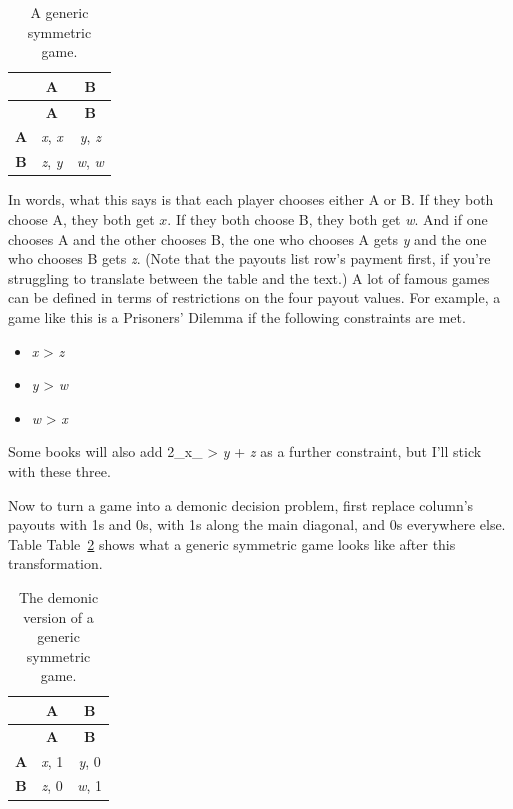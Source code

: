 \documentclass[
  12pt,
  letterpaper,
  DIV=11,
  numbers=noendperiod]{scrreprt}
\providecommand{\tightlist}{%
  \setlength{\itemsep}{0pt}\setlength{\parskip}{0pt}}\usepackage{longtable,booktabs,array}
\begin{document}
\begin{longtable}[]{@{}ccc@{}}
\caption{A generic symmetric
game.}\label{tbl-basic-sym-game}\tabularnewline
\toprule\noalign{}
& \textbf{A} & \textbf{B} \\
\midrule\noalign{}
\endfirsthead
\toprule\noalign{}
& \textbf{A} & \textbf{B} \\
\midrule\noalign{}
\endhead
\bottomrule\noalign{}
\endlastfoot
\textbf{A} & \emph{x}, \emph{x} & \emph{y}, \emph{z} \\
\textbf{B} & \emph{z}, \emph{y} & \emph{w}, \emph{w} \\
\end{longtable}

In words, what this says is that each player chooses either A or B. If
they both choose A, they both get \(x\). If they both choose B, they
both get \emph{w}. And if one chooses A and the other chooses B, the one
who chooses A gets \emph{y} and the one who chooses B gets \emph{z}.
(Note that the payouts list row's payment first, if you're struggling to
translate between the table and the text.) A lot of famous games can be
defined in terms of restrictions on the four payout values. For example,
a game like this is a Prisoners' Dilemma if the following constraints
are met.

\begin{itemize}
\tightlist
\item
  \emph{x} \textgreater{} \emph{z}
\item
  \emph{y} \textgreater{} \emph{w}
\item
  \emph{w} \textgreater{} \emph{x}
\end{itemize}

Some books will also add 2\_x\_ \textgreater{} \emph{y} + \emph{z} as a
further constraint, but I'll stick with these three.

Now to turn a game into a demonic decision problem, first replace
column's payouts with 1s and 0s, with 1s along the main diagonal, and 0s
everywhere else. Table Table~\ref{tbl-demon-sym-game} shows what a
generic symmetric game looks like after this transformation.

\begin{longtable}[]{@{}ccc@{}}
\caption{The demonic version of a generic symmetric
game.}\label{tbl-demon-sym-game}\tabularnewline
\toprule\noalign{}
& \textbf{A} & \textbf{B} \\
\midrule\noalign{}
\endfirsthead
\toprule\noalign{}
& \textbf{A} & \textbf{B} \\
\midrule\noalign{}
\endhead
\bottomrule\noalign{}
\endlastfoot
\textbf{A} & \emph{x}, 1 & \emph{y}, 0 \\
\textbf{B} & \emph{z}, 0 & \emph{w}, 1 \\
\end{longtable}
\end{document}
